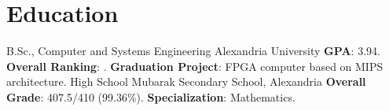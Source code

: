 \documentclass[letterpaper]{twentysecondcv} %
\begin{document}



\makeprofile


\section{Education}

\begin{twenty} %
               {B.Sc., Computer and Systems Engineering}
               {Alexandria University}
               {\textbf{GPA}: 3.94.\newline
                \textbf{Overall Ranking}: \underline{}.\newline
                \textbf{Graduation Project}: FPGA computer based on MIPS architecture.\newline
               }
               {High School}
               {Mubarak Secondary School, Alexandria}
               {\textbf{Overall Grade}: 407.5/410 (99.36\%).\newline
                \textbf{Specialization}: Mathematics.}
\end{twenty}

\end{document}
